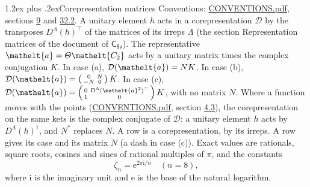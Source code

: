 \documentclass[10pt,a4paper]{article}
\makeatletter
\renewcommand\section{\@startsection{section}{1}{\z@}{-3ex plus -1ex minus -.2ex}%
  {1.2ex plus .2ex}{\normalfont\large\sffamily\bfseries\color{parttitle}}}
\numberwithin{equation}{section}
\newcommand{\eltfont}[1]{{\let\sigma\eltsigma\mathelt{#1}}}
\newcommand{\grp}[1]{\mathsf{#1}}
\newcommand{\elt}[1]{\eltfont{#1}}
\newcommand{\iunit}{\mathrm{i}}
\newcommand{\expe}{\mathrm{e}}
\newcommand{\rootunity}[1]{\zeta_{#1}}
\makeatother
\begin{document}
\section{Corepresentation matrices}\label{s:corep_matrices}
Conventions: \href{../../CONVENTIONS.pdf}{CONVENTIONS.pdf}, sections \href{../../../rotation/CONVENTIONS.pdf\#conv.9}{9} and \href{../../CONVENTIONS.pdf\#conv.32.2}{32.2}.
A unitary element $h$ acts in a corepresentation $\mathcal{D}$ by the transposes $D^{\Lambda}(h)^{\top}$ of the matrices of its irreps $\Lambda$ (the section Representation matrices of the document of \href{../../../rotation/data/pdf/C8v.pdf}{$\grp{C_{8v}}$}). The representative $\elt{a} = \varTheta\elt{C_{2}}$ acts by a unitary matrix times the complex conjugation $K$.
In case (a), $\mathcal{D}(\elt{a}) = NK$. In case (b), $\mathcal{D}(\elt{a}) = \left(\begin{smallmatrix} 0 & N \\ -N & 0 \end{smallmatrix}\right) K$. In case (c), $\mathcal{D}(\elt{a}) = \left(\begin{smallmatrix} 0 & D^{\Lambda}(\elt{a}^2)^{\top} \\ 1 & 0 \end{smallmatrix}\right) K$, with no matrix $N$.
Where a function moves with the points (\href{../../CONVENTIONS.pdf}{CONVENTIONS.pdf}, section \href{../../../rotation/CONVENTIONS.pdf\#conv.4.3}{4.3}), the corepresentation on the same kets is the complex conjugate of $\mathcal{D}$: a unitary element $h$ acts by $D^{\Lambda}(h)^{\dagger}$, and $N^{*}$ replaces $N$.
A row is a corepresentation, by its irreps. A row gives its case and its matrix $N$ (a dash in case (c)).
\leavevmode\label{n:constant.root}\label{n:index.root.order}Exact values are rationals, square roots, cosines and sines of rational multiples of $\pi$, and the constants
\begin{equation}\label{e:constants}\rootunity{n} = \expe^{2\pi\iunit/n}\quad(n = 8),\end{equation}
where $\iunit$ is the imaginary unit and $\expe$ is the base of the natural logarithm.
\end{document}

